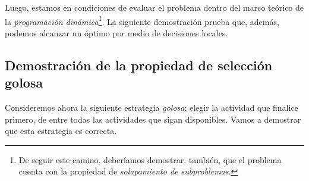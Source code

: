 Luego, estamos en condiciones de evaluar el problema dentro del marco teórico de la \textit{programación dinámica}\footnote{De seguir este camino, deberíamos demostrar, también, que el problema cuenta con la propiedad de \textit{solapamiento de subproblemas}.}. La siguiente demostración prueba que, además, podemos alcanzar un óptimo por medio de decisiones locales. 

\subsection{Demostración de la propiedad de selección golosa} Consideremos ahora la siguiente estrategia \textit{golosa}: elegir la actividad que finalice primero, de entre todas las actividades que sigan disponibles. Vamos a demostrar que esta estrategia es correcta.

